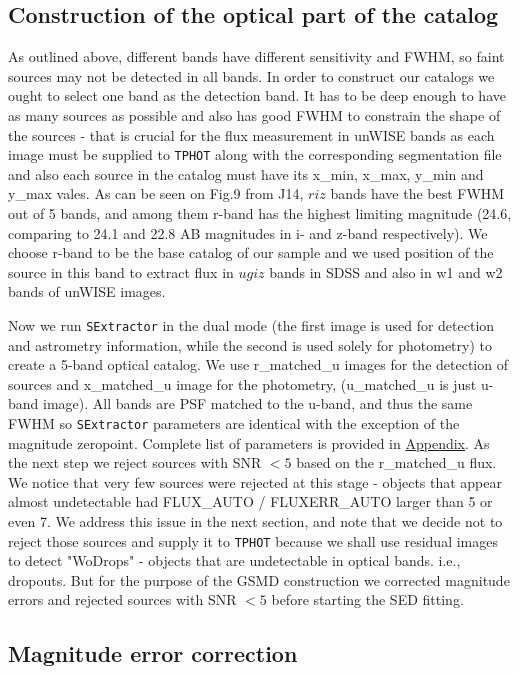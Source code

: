 \subsection{Construction of the optical part of the catalog}
As outlined above, different bands have different sensitivity and FWHM, so faint sources may not be detected in all bands. In order to construct our catalogs we ought to select one band as the detection band. It has to be deep enough to have as many sources as possible and also has good FWHM to constrain the shape of the sources - that is crucial for the flux measurement in unWISE bands as each image must be supplied to {\tt TPHOT} along with the corresponding segmentation file and also each source in the catalog must have its x\_min, x\_max, y\_min and y\_max vales. As can be seen on Fig.9 from J14, $riz$ bands have the best FWHM out of 5 bands, and among them r-band has the highest limiting magnitude (24.6, comparing to 24.1 and 22.8 AB magnitudes in i- and z-band respectively). We choose r-band to be the base catalog of our sample and we used position of the source in this band to extract flux in $ugiz$ bands in SDSS and also in w1 and w2 bands of unWISE images.

Now we run {\tt SExtractor} in the dual mode (the first image is used for detection and astrometry information, while the second is used solely for photometry) to create a 5-band optical catalog. We use r\_matched\_u images for the detection of sources and x\_matched\_u image for the photometry, (u\_matched\_u is just u-band image). All bands are PSF matched to the u-band, and thus the same FWHM so {\tt SExtractor} parameters are identical with the exception of the magnitude zeropoint. Complete list of parameters is provided in \hyperref[sec:sex]{Appendix}. As the next step we reject sources with SNR $<5$ based on the r\_matched\_u flux. We notice that very few sources were rejected at this stage - objects that appear almost undetectable had FLUX\_AUTO / FLUXERR\_AUTO larger than 5 or even 7. We address this issue in the next section, and note that we decide not to reject those sources and supply it to {\tt TPHOT} because we shall use residual images to detect "WoDrops" - objects that are undetectable in optical bands. i.e., dropouts. But for the purpose of the GSMD construction we corrected magnitude errors and rejected sources with SNR $<5$ before starting the SED fitting.

\subsection{Magnitude error correction}

